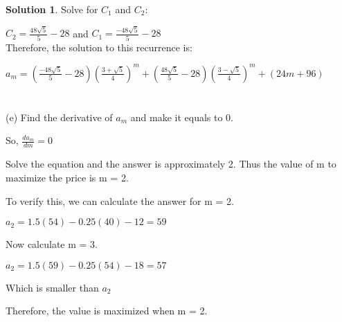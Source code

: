 \documentclass{article}
\theoremstyle{definition}
\newtheorem*{solution}{Solution}
\begin{document}
\begin{solution}
Solve for \(C_1\) and \(C_2\):

\(C_2 = \frac{48\sqrt{5}}{5} - 28 \) and \(C_1 = \frac{-48\sqrt{5}}{5} - 28 \)\\

Therefore, the solution to this recurrence is:

\(a_m = (\frac{-48\sqrt{5}}{5} - 28)(\frac{3 + \sqrt{5}}{4})^m + (\frac{48\sqrt{5}}{5} - 28)(\frac{3 - \sqrt{5}}{4})^m + (24m + 96)\)\\\\\\


(e) Find the derivative of \(a_m\) and make it equals to 0.

So, \(\frac{da_m}{dm} = 0\)

Solve the equation and the answer is approximately 2. Thus the value of m to maximize the price is m = 2.

To verify this, we can calculate the answer for m = 2.

\(a_2 = 1.5(54) - 0.25(40) - 12 = 59\)

Now calculate m = 3.

\(a_2 = 1.5(59) - 0.25(54) - 18 = 57\)

Which is smaller than \(a_2\)

Therefore, the value is maximized when m = 2.








\end{solution}
\end{document}

